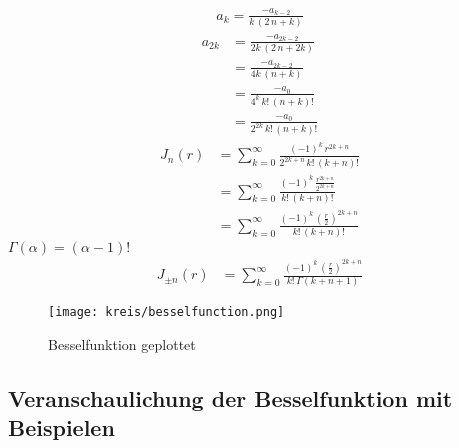 \begin{refsection}
\begin{align}
	a_k
	=
	\frac
	{
		-a_{k - 2}
	}{
		k \, \left( 2 \, n + k \right)	
	}
	\label{eq:bessel_koeffreq}
\end{align}
\begin{align*}
	a_{2k}
	&=
	\frac
	{
		-a_{2k - 2}
	}{
		2k \, \left( 2 \, n + 2k \right)	
	} \\
	&=
	\frac
	{
		-a_{2k - 2}
	}{
		4k \, \left( n + k \right)	
	} \\
	&=
	\frac
	{
		-a_0
	}{
		4^k \, {k}! \, {\left( n + k \right)}!
	} \\
	&=
	\frac
	{
		-a_0
	}{
		2^{2k} \, {k}! \, {\left( n + k \right)}!
	}
\end{align*}
\begin{align}
	J_n \left( r \right)
	&= \nonumber
	\sum_{k=0} ^{\infty}
	\frac
	{
		\left( - 1 \right) ^k \, r ^{2k+n}
	}{
		2^{2k+n} \, {k}! \, { \left( k + n \right) }!
	} \\
	&=
	\sum_{k=0} ^{\infty}
	\frac
	{
		\left( - 1 \right) ^k \, 
		\frac
		{
			r ^{2k+n}
		}{
			2^{2k+n}
		}
	}{
		{k}! \, { \left( k + n \right) }!
	} \\
	&=
	\sum_{k=0} ^{\infty}
	\frac
	{
		\left( - 1 \right) ^k \, 
		\left(		
		\frac
		{
			r
		}{
			2
		} \right) ^{2k+n}
	}{
		{k}! \, { \left( k + n \right) }!
	}
	\label{eq:bessel_summenformel}
\end{align}
$\Gamma \left( \alpha \right) = {\left( \alpha - 1 \right) }!$
\begin{align}
	J_{\pm n} \left( r \right)
	&=
	\sum_{k=0} ^{\infty}
	\frac
	{
		\left( - 1 \right) ^k \, 
		\left(		
		\frac
		{
			r
		}{
			2
		} \right) ^{2k+n}
	}{
		{k}! \, \Gamma \left( k + n + 1 \right)
	}
	\label{eq:bessel_summenformel:allgemein}
\end{align}



\begin{figure}
	\texttt{[image: kreis/besselfunction.png]}
	\label{img:besselfunction}
	\caption[Besselfunktion]{Besselfunktion geplottet}
\end{figure}

\subsection{Veranschaulichung der Besselfunktion mit Beispielen}

\printbibliography[heading=subbibliography]
\end{refsection}

